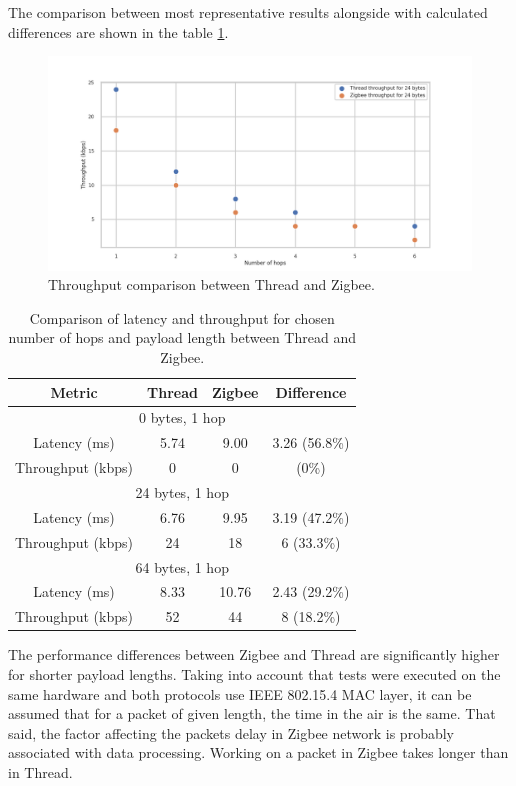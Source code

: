 The comparison
between most representative results alongside with calculated differences are shown in the table 
\ref{table:comparison}.

\begin{figure}[H]
    \centering
    \includegraphics[scale=0.45]{images/Thread_vs_Zigbee_Throoughput.png}
    \caption{Throughput comparison between Thread and Zigbee.}
    \label{fig:thread_vs_zigbee_throughput}
\end{figure}



\begin{table}[H]
\centering
\begin{tabular}{|c|c|c|c|}
\hline
Metric    & Thread & Zigbee & Difference        \\
\hline
\multicolumn{4}{c}{0 bytes, 1 hop}     \\
\hline
Latency (ms)   &   5.74     &   9.00     &  3.26 (56.8\%)               \\
Throughput (kbps) &   0     &    0    &          (0\%)         \\
\hline
\multicolumn{4}{c}{24 bytes, 1 hop}    \\
\hline
Latency (ms)   &  6.76      &   9.95     &     3.19 (47.2\%)             \\
Throughput (kbps) &   24     &    18    &     6  (33.3\%)            \\
\hline
\multicolumn{4}{c}{64 bytes, 1 hop}    \\
\hline
Latency (ms)   &   8.33     &   10.76     &    2.43  (29.2\%)          \\
Throughput (kbps) &   52     &    44    &   8   (18.2\%)            \\
\hline
\end{tabular}
\caption{Comparison of latency and throughput for chosen number of hops and payload length between Thread and Zigbee.}
\label{table:comparison}
\end{table}

The performance differences between Zigbee and Thread are significantly
higher for shorter payload lengths. Taking into account that tests
were executed on the same hardware and both protocols use IEEE 802.15.4
MAC layer, it can be assumed that for a packet of given length, the 
time in the air is the same. That said, the factor affecting the
packets delay in Zigbee network is probably associated with data 
processing. Working on a packet in Zigbee takes longer than in
Thread.
